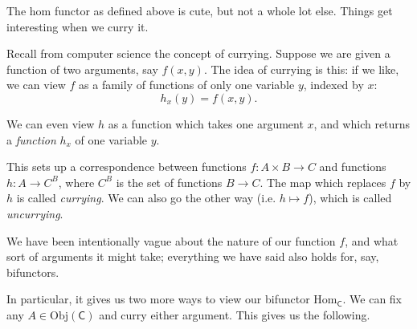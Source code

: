 \documentclass[a4paper,10pt]{scrreprt}
\newcommand{\Obj}{\mathrm{Obj}}
\newcommand{\Hom}{\mathrm{Hom}}
\theoremstyle{definition}
\theoremstyle{plain}
\theoremstyle{remark}
\begin{document}
The hom functor as defined above is cute, but not a whole lot else. Things get interesting when we curry it.

Recall from computer science the concept of currying. Suppose we are given a function of two arguments, say $f(x, y)$. The idea of currying is this: if we like, we can view $f$ as a family of functions of only one variable $y$, indexed by $x$:
\begin{equation*}
  h_{x}(y) = f(x, y).
\end{equation*}

We can even view $h$ as a function which takes one argument $x$, and which returns a \emph{function} $h_{x}$ of one variable $y$.

This sets up a correspondence between functions $f\colon A \times B \to C$ and functions $h\colon A \to C^{B}$, where $C^{B}$ is the set of functions $B \to C$. The map which replaces $f$ by $h$ is called \emph{currying}. We can also go the other way (i.e. $h \mapsto f$), which is called \emph{uncurrying}.

We have been intentionally vague about the nature of our function $f$, and what sort of arguments it might take; everything we have said also holds for, say, bifunctors.

In particular, it gives us two more ways to view our bifunctor $\Hom_{\mathsf{C}}$. We can fix any $A \in \Obj(\mathsf{C})$ and curry either argument. This gives us the following.
\end{document}
